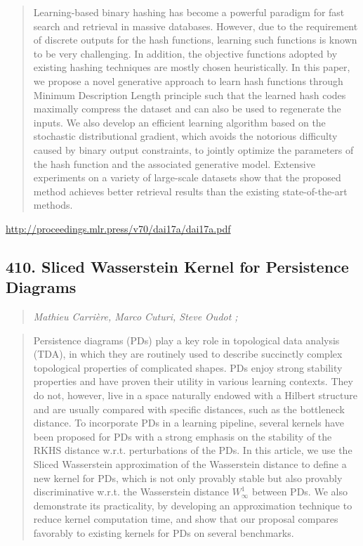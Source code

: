 \documentclass{article}
\begin{document}
\begin{quote}
    Learning-based binary hashing has become a powerful paradigm for fast search and retrieval in massive databases. However, due to the requirement of discrete outputs for the hash functions, learning such functions is known to be very challenging. In addition, the objective functions adopted by existing hashing techniques are mostly chosen heuristically. In this paper, we propose a novel generative approach to learn hash functions through Minimum Description Length principle such that the learned hash codes maximally compress the dataset and can also be used to regenerate the inputs. We also develop an efficient learning algorithm based on the stochastic distributional gradient, which avoids the notorious difficulty caused by binary output constraints, to jointly optimize the parameters of the hash function and the associated generative model. Extensive experiments on a variety of large-scale datasets show that the proposed method achieves better retrieval results than the existing state-of-the-art methods.  \end{quote}

\href{http://proceedings.mlr.press/v70/dai17a/dai17a.pdf}{http://proceedings.mlr.press/v70/dai17a/dai17a.pdf}

\subsection{410. Sliced Wasserstein Kernel for Persistence Diagrams}

\begin{quote}
\footnotesize{\textit{Mathieu Carrière, Marco Cuturi, Steve Oudot ;}}
\end{quote}

\begin{quote}
    Persistence diagrams (PDs) play a key role in topological data analysis (TDA), in which they are routinely used to describe succinctly complex topological properties of complicated shapes. PDs enjoy strong stability properties and have proven their utility in various learning contexts. They do not, however, live in a space naturally endowed with a Hilbert structure and are usually compared with specific distances, such as the bottleneck distance. To incorporate PDs in a learning pipeline, several kernels have been proposed for PDs with a strong emphasis on the stability of the RKHS distance w.r.t. perturbations of the PDs. In this article, we use the Sliced Wasserstein approximation of the Wasserstein distance to define a new kernel for PDs, which is not only provably stable but also provably discriminative w.r.t. the Wasserstein distance $W^1_\infty$ between PDs. We also demonstrate its practicality, by developing an approximation technique to reduce kernel computation time, and show that our proposal compares favorably to existing kernels for PDs on several benchmarks.  \end{quote}
\end{document}
